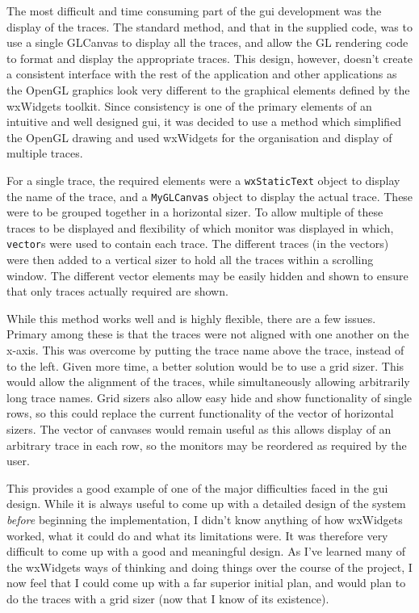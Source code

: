 \documentclass[a4paper,10pt]{article}  %
\begin{document}
The most difficult and time consuming part of the gui development was
the display of the traces. The standard method, and that in the
supplied code, was to use a single GLCanvas to display all the traces,
and allow the GL rendering code to format and display the appropriate
traces. This design, however, doesn't create a consistent interface
with the rest of the application and other applications as the OpenGL
graphics look very different to the graphical elements defined by the
wxWidgets toolkit. Since consistency is one of the primary elements of
an intuitive and well designed gui, it was decided to use a method
which simplified the OpenGL drawing and used wxWidgets for the
organisation and display of multiple traces.

For a single trace, the required elements were a \texttt{wxStaticText}
object to display the name of the trace, and a \texttt{MyGLCanvas}
object to display the actual trace. These were to be grouped together
in a horizontal sizer. To allow multiple of these traces to be
displayed and flexibility of which monitor was displayed in which,
\texttt{vector}s were used to contain each trace. The different traces
(in the vectors) were then added to a vertical sizer to hold all the
traces within a scrolling window. The different vector elements may be
easily hidden and shown to ensure that only traces actually required
are shown.

While this method works well and is highly flexible, there are a few
issues. Primary among these is that the traces were not aligned with
one another on the x-axis. This was overcome by putting the trace name
above the trace, instead of to the left. Given more time, a better
solution would be to use a grid sizer. This would allow the alignment
of the traces, while simultaneously allowing arbitrarily long trace
names. Grid sizers also allow easy hide and show functionality of
single rows, so this could replace the current functionality of the
vector of horizontal sizers. The vector of canvases would remain
useful as this allows display of an arbitrary trace in each row, so
the monitors may be reordered as required by the user.

This provides a good example of one of the major difficulties faced in
the gui design. While it is always useful to come up with a detailed
design of the system \emph{before} beginning the implementation, I
didn't know anything of how wxWidgets worked, what it could do and
what its limitations were. It was therefore very difficult to come up
with a good and meaningful design. As I've learned many of the
wxWidgets ways of thinking and doing things over the course of the
project, I now feel that I could come up with a far superior initial
plan, and would plan to do the traces with a grid sizer (now that I
know of its existence).
\end{document}
